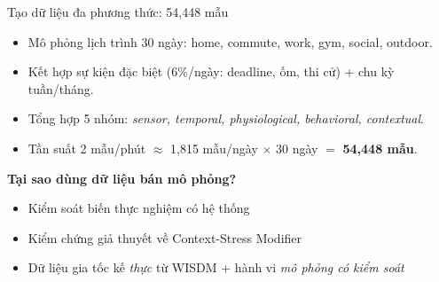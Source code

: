 \documentclass[11pt]{beamer}
\begin{document}
\begin{frame}{Tạo dữ liệu đa phương thức: 54,448 mẫu}
\small
\begin{itemize}
    \item Mô phỏng lịch trình 30 ngày: home, commute, work, gym, social, outdoor.
    \item Kết hợp sự kiện đặc biệt (6\%/ngày: deadline, ốm, thi cử) + chu kỳ tuần/tháng.
    \item Tổng hợp 5 nhóm: \textit{sensor, temporal, physiological, behavioral, contextual}.
    \item Tần suất 2 mẫu/phút $\approx$ 1,815 mẫu/ngày $\times$ 30 ngày $= $ \textbf{54,448 mẫu}.
\end{itemize}

\vspace{0.08cm}
\textbf{Tại sao dùng dữ liệu bán mô phỏng?}
\begin{itemize}
    \item Kiểm soát biến thực nghiệm có hệ thống
    \item Kiểm chứng giả thuyết về Context-Stress Modifier
    \item Dữ liệu gia tốc kế \textit{thực} từ WISDM + hành vi \textit{mô phỏng có kiểm soát}
\end{itemize}

\vspace{0.04cm}
\end{frame}
\end{document}
